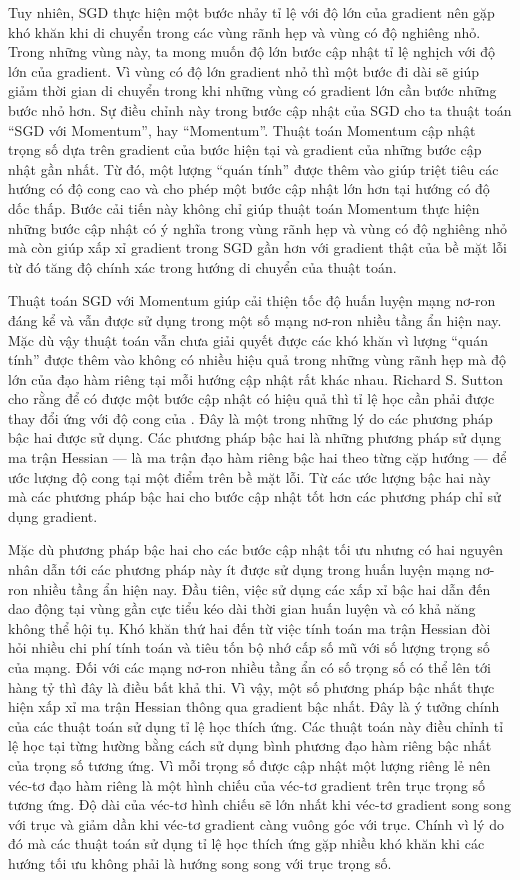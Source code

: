 Tuy nhiên, SGD thực hiện một bước nhảy tỉ lệ với độ lớn của gradient nên gặp khó khăn khi di chuyển trong các vùng rãnh hẹp và vùng có độ nghiêng nhỏ. Trong những vùng này, ta mong muốn độ lớn bước cập nhật tỉ lệ nghịch với độ lớn của gradient. Vì vùng có độ lớn gradient nhỏ thì một bước đi dài sẽ giúp giảm thời gian di chuyển trong khi những vùng có gradient lớn cần bước những bước nhỏ hơn. Sự điều chỉnh này trong bước cập nhật của SGD cho ta thuật toán ``SGD với Momentum'', hay ``Momentum''. Thuật toán Momentum cập nhật trọng số dựa trên gradient của bước hiện tại và gradient của những bước cập nhật gần nhất. Từ đó, một lượng ``quán tính'' được thêm vào giúp triệt tiêu các hướng có độ cong cao và cho phép một bước cập nhật lớn hơn tại hướng có độ dốc thấp. Bước cải tiến này không chỉ giúp thuật toán Momentum thực hiện những bước cập nhật có ý nghĩa trong vùng rãnh hẹp và vùng có độ nghiêng nhỏ mà còn giúp xấp xỉ gradient trong SGD gần hơn với gradient thật của bề mặt lỗi từ đó tăng độ chính xác trong hướng di chuyển của thuật toán.

Thuật toán SGD với Momentum giúp cải thiện tốc độ huấn luyện mạng nơ-ron đáng kể và vẫn được sử dụng trong một số mạng nơ-ron nhiều tầng ẩn hiện nay. Mặc dù vậy thuật toán vẫn chưa giải quyết được các khó khăn vì lượng ``quán tính'' được thêm vào không có nhiều hiệu quả trong những vùng rãnh hẹp mà độ lớn của đạo hàm riêng tại mỗi hướng cập nhật rất khác nhau. Richard S. Sutton cho rằng để có được một bước cập nhật có hiệu quả thì tỉ lệ học cần phải được thay đổi ứng với độ cong của  \cite{sutton1986two}. Đây là một trong những lý do các phương pháp bậc hai được sử dụng. Các phương pháp bậc hai là những phương pháp sử dụng ma trận Hessian — là ma trận đạo hàm riêng bậc hai theo từng cặp hướng — để ước lượng độ cong tại một điểm trên bề mặt lỗi. Từ các ước lượng bậc hai này mà các phương pháp bậc hai cho bước cập nhật tốt hơn các phương pháp chỉ sử dụng gradient.

Mặc dù phương pháp bậc hai cho các bước cập nhật tối ưu nhưng có hai nguyên nhân dẫn tới các phương pháp này ít được sử dụng trong huấn luyện mạng nơ-ron nhiều tầng ẩn hiện nay. Đầu tiên, việc sử dụng các xấp xỉ bậc hai dẫn đến dao động tại vùng gần cực tiểu kéo dài thời gian huấn luyện và có khả năng không thể hội tụ. Khó khăn thứ hai đến từ việc tính toán ma trận Hessian đòi hỏi nhiều chi phí tính toán và tiêu tốn bộ nhớ cấp số mũ với số lượng trọng số của mạng. Đối với các mạng nơ-ron nhiều tầng ẩn có số trọng số có thể lên tới hàng tỷ thì đây là điều bất khả thi. Vì vậy, một số phương pháp bậc nhất thực hiện xấp xỉ ma trận Hessian thông qua gradient bậc nhất. Đây là ý tưởng chính của các thuật toán sử dụng tỉ lệ học thích ứng. Các thuật toán này điều chỉnh tỉ lệ học tại từng hường bằng cách sử dụng bình phương đạo hàm riêng bậc nhất của trọng số tương ứng. Vì mỗi trọng số được cập nhật một lượng riêng lẻ nên véc-tơ đạo hàm riêng là một hình chiếu của véc-tơ gradient trên trục trọng số tương ứng. Độ dài của véc-tơ hình chiếu sẽ lớn nhất khi véc-tơ gradient song song với trục và giảm dần khi véc-tơ gradient càng vuông góc với trục. Chính vì lý do đó mà các thuật toán sử dụng tỉ lệ học thích ứng gặp nhiều khó khăn khi các hướng tối ưu không phải là hướng song song với trục trọng số.

